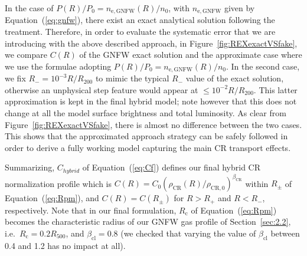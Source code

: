 \documentclass[traditabstract]{aa}
\newcommand{\rmn}{\mathrm}
\begin{document}
\begin{appendix}
In the case of $P(R)/P_{0}=n_{\rmn{e,GNFW}}(R)/n_{0}$, with $n_{\rmn{e,GNFW}}$ given by Equation~(\ref{eq:gnfw}), 
there exist an exact analytical solution following the \cite{2011A&A...527A..99E} treatment. Therefore, in order 
to evaluate the systematic error that we are introducing with the above described approach, 
in Figure~\ref{fig:REXexactVSfake}, we compare $C(R)$ of the GNFW exact solution and the approximate 
case where we use the \cite{2011A&A...527A..99E} formulae adopting $P(R)/P_{0}=n_{\rmn{e,GNFW}}(R)/n_{0}$. 
In the second case, we fix $R_{-}=10^{-3}R/R_{200}$ to mimic the typical $R_{-}$ value of the exact solution, otherwise 
an unphysical step feature would appear at $\leq10^{-2}R/R_{200}$. This latter approximation is kept in the final hybrid 
model; note however that this does not change at all the model surface brightness and total luminosity. 
As clear from Figure~\ref{fig:REXexactVSfake}, there is almost no difference between the two cases. 
This shows that the approximated approach strategy can be safely followed in order to derive a fully working model 
capturing the main CR transport effects. 

Summarizing, $C_{hybrid}$ of Equation~(\ref{eq:Cf}) defines our final hybrid CR normalization profile which is 
$C(R)=C_{0}(\rho_{\rmn{CR}}(R)/\rho_{\rmn{CR},0})^{\beta_{\rmn{CR}}}$ within $R_{\pm}$ of Equation~(\ref{eq:Rpm}), 
and $C(R) = C(R_{\pm})$ for $R > R_{+}$ and $R < R_{-}$, respectively. Note that in our final formulation, 
$R_{\rmn{c}}$ of Equation~(\ref{eq:Rpm}) becomes the characteristic radius of our GNFW gas profile of 
Section~\ref{sec:2.2}, i.e.~$R_{\rmn{c}} = 0.2 R_{500}$, and $\beta_{\rmn{cl}}=0.8$ 
(we checked that varying the value of $\beta_{\rmn{cl}}$ between 0.4 and 1.2 has no impact at all).


\end{appendix}
\end{document}
